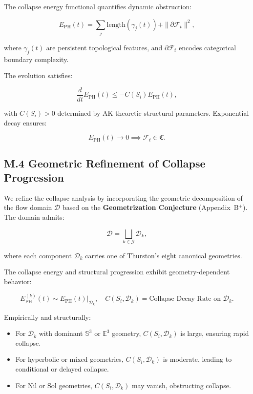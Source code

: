 \documentclass[11pt]{article}
\begin{document}
The collapse energy functional quantifies dynamic obstruction:

\[
E_{\mathrm{PH}}(t) = \sum_j \mathrm{length}(\gamma_j(t)) + \|\partial \mathcal{F}_t\|^2,
\]

where $\gamma_j(t)$ are persistent topological features, and $\partial \mathcal{F}_t$ encodes categorical boundary complexity.

The evolution satisfies:

\[
\frac{d}{dt} E_{\mathrm{PH}}(t) \leq -C(S_i) E_{\mathrm{PH}}(t),
\]

with $C(S_i) > 0$ determined by AK-theoretic structural parameters. Exponential decay ensures:

\[
E_{\mathrm{PH}}(t) \to 0 \implies \mathcal{F}_t \in \mathfrak{C}.
\]

\subsection*{M.4 Geometric Refinement of Collapse Progression}

We refine the collapse analysis by incorporating the geometric decomposition of the flow domain $\mathcal{D}$ based on the \textbf{Geometrization Conjecture} (Appendix~B$^+$). The domain admits:

\[
\mathcal{D} = \bigsqcup_{k \in \mathcal{G}} \mathcal{D}_k,
\]

where each component $\mathcal{D}_k$ carries one of Thurston's eight canonical geometries.

The collapse energy and structural progression exhibit geometry-dependent behavior:

\[
E_{\mathrm{PH}}^{(k)}(t) \sim E_{\mathrm{PH}}(t)|_{\mathcal{D}_k}, \quad C(S_i, \mathcal{D}_k) = \text{Collapse Decay Rate on } \mathcal{D}_k.
\]

Empirically and structurally:

\begin{itemize}
  \item For $\mathcal{D}_k$ with dominant $\mathbb{S}^3$ or $\mathbb{E}^3$ geometry, $C(S_i, \mathcal{D}_k)$ is large, ensuring rapid collapse.
  \item For hyperbolic or mixed geometries, $C(S_i, \mathcal{D}_k)$ is moderate, leading to conditional or delayed collapse.
  \item For $\mathrm{Nil}$ or $\mathrm{Sol}$ geometries, $C(S_i, \mathcal{D}_k)$ may vanish, obstructing collapse.
\end{itemize}
\end{document}
